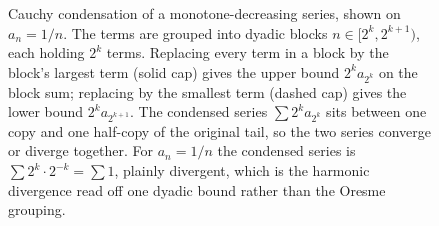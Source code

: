 \begin{figure}[ht]
\caption[Cauchy condensation of a monotone series]{Cauchy condensation
of a monotone-decreasing series, shown on $a_{n}=1/n$. The terms are
grouped into dyadic blocks $n\in[2^{k},2^{k+1})$, each holding $2^{k}$
terms. Replacing every term in a block by the block's largest term (solid
cap) gives the upper bound $2^{k}a_{2^{k}}$ on the block sum; replacing by
the smallest term (dashed cap) gives the lower bound $2^{k}a_{2^{k+1}}$.
The condensed series $\sum 2^{k}a_{2^{k}}$ sits between one copy and one
half-copy of the original tail, so the two series converge or diverge
together. For $a_{n}=1/n$ the condensed series is $\sum 2^{k}\cdot
2^{-k}=\sum 1$, plainly divergent, which is the harmonic divergence read
off one dyadic bound rather than the Oresme grouping.}
\label{fig:vol02:ch04:cauchy-condensation}
\end{figure}
